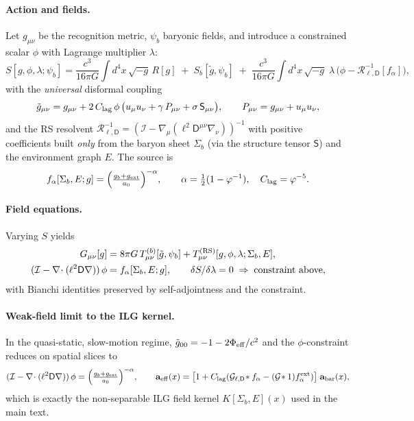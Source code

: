 \documentclass[12pt,a4paper]{article}
\begin{document}
\paragraph{Action and fields.} Let $g_{\mu\nu}$ be the recognition metric, $\psi_b$ baryonic fields, and introduce a constrained scalar $\phi$ with Lagrange multiplier $\lambda$:
\begin{equation}
S[g,\phi,\lambda;\psi_b]=\frac{c^3}{16\pi G}\!\int d^4x\,\sqrt{-g}\,R[g]\;+\;S_b[\tilde g,\psi_b]\;+\;\frac{c^3}{16\pi G}\!\int d^4x\,\sqrt{-g}\;\lambda\,\Big(\phi-\mathcal R^{-1}_{\ell,\mathsf D}[f_\alpha]\Big),
\end{equation}
with the \emph{universal} disformal coupling
\begin{equation}
\tilde g_{\mu\nu}=g_{\mu\nu}+2\,C_{\rm lag}\,\phi\,\big(u_\mu u_\nu+\gamma\,P_{\mu\nu}+\sigma\,\mathsf S_{\mu\nu}\big),\qquad P_{\mu\nu}=g_{\mu\nu}+u_\mu u_\nu,
\end{equation}
and the RS resolvent $\mathcal R^{-1}_{\ell,\mathsf D}=(\mathcal I-\nabla_\mu(\ell^2\mathsf D^{\mu\nu}\nabla_\nu))^{-1}$ with positive coefficients built \emph{only} from the baryon sheet $\Sigma_b$ (via the structure tensor $\mathsf S$) and the environment graph $E$. The source is
\begin{equation}
f_\alpha[\Sigma_b,E;g]=\Big(\tfrac{g_b+g_{\rm ext}}{a_0}\Big)^{-\alpha},\qquad \alpha=\tfrac12(1-\varphi^{-1}),\quad C_{\rm lag}=\varphi^{-5}.
\end{equation}

\paragraph{Field equations.} Varying $S$ yields
\begin{align}
G_{\mu\nu}[g]&=8\pi G\,T^{(b)}_{\mu\nu}[\tilde g,\psi_b]+T^{(\rm RS)}_{\mu\nu}[g,\phi,\lambda;\Sigma_b,E],\\
(\mathcal I-\nabla\!\cdot(\ell^2\mathsf D\nabla))\,\phi&=f_\alpha[\Sigma_b,E;g],\qquad \delta S/\delta\lambda=0 \;\Rightarrow\; \text{constraint above},
\end{align}
with Bianchi identities preserved by self-adjointness and the constraint.

\paragraph{Weak-field limit to the ILG kernel.} In the quasi-static, slow-motion regime, $\tilde g_{00}=-1-2\Phi_{\rm eff}/c^2$ and the $\phi$-constraint reduces on spatial slices to
\begin{equation}
(\mathcal I-\nabla\!\cdot(\ell^2\mathsf D\nabla))\,\phi=\Big(\tfrac{g_b+g_{\rm ext}}{a_0}\Big)^{-\alpha},\qquad \mathbf a_{\rm eff}(x)=\big[1+C_{\rm lag}(\mathcal G_{\ell,\mathsf D}\!\ast f_\alpha- (\mathcal G\!\ast 1)f_\alpha^{\rm ext})\big] \;\mathbf a_{\rm bar}(x),
\end{equation}
which is exactly the non-separable ILG field kernel $K[\Sigma_b,E](x)$ used in the main text.
\end{document}

